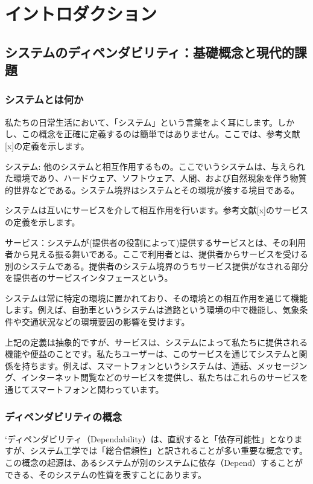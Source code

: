 \chapter{イントロダクション}
\label{chap1}

\section{システムのディペンダビリティ：基礎概念と現代的課題}

\subsection{システムとは何か}

私たちの日常生活において、「システム」という言葉をよく耳にします。しかし、この概念を正確に定義するのは簡単ではありません。ここでは、参考文献[x]の定義を示します。

システム: 他のシステムと相互作用するもの。ここでいうシステムは、与えられた環境であり、ハードウェア、ソフトウェア、人間、および自然現象を伴う物質的世界などである。システム境界はシステムとその環境が接する境目である。

システムは互いにサービスを介して相互作用を行います。参考文献[x]のサービスの定義を示します。

サービス：システムが(提供者の役割によって)提供するサービスとは、その利用者から見える振る舞いである。ここで利用者とは、提供者からサービスを受ける別のシステムである。提供者のシステム境界のうちサービス提供がなされる部分を提供者のサービスインタフェースという。

システムは常に特定の環境に置かれており、その環境との相互作用を通じて機能します。例えば、自動車というシステムは道路という環境の中で機能し、気象条件や交通状況などの環境要因の影響を受けます。

上記の定義は抽象的ですが、サービスは、システムによって私たちに提供される機能や便益のことです。私たちユーザーは、このサービスを通じてシステムと関係を持ちます。例えば、スマートフォンというシステムは、通話、メッセージング、インターネット閲覧などのサービスを提供し、私たちはこれらのサービスを通じてスマートフォンと関わっています。

\subsection{ディペンダビリティの概念}
`ディペンダビリティ（Dependability）は、直訳すると「依存可能性」となりますが、システム工学では「総合信頼性」と訳されることが多い重要な概念です。この概念の起源は、あるシステムが別のシステムに依存（Depend）することができる、そのシステムの性質を表すことにあります。

